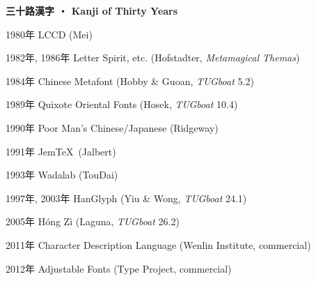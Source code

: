 \documentclass[17pt]{extarticle}
\newenvironment{slide}{\clearpage\vspace*{\fill}\large}{\vspace*{\fill}}
\newenvironment{bil}%
  {\renewcommand{\arraystretch}{0.6}\begin{tabular}{cc}}{\end{tabular}}
\newcommand{\slidetitle}[1]%
   {{\centering\Large\sffamily\bfseries#1\par}\rmfamily}
\begin{document}

\begin{slide}

\slidetitle{三十路漢字 ・ Kanji of Thirty Years}

1980年 LCCD (Mei)

1982年, 1986年 Letter Spirit, etc. (Hofstadter, \textit{Metamagical Themas})

1984年 Chinese Metafont (Hobby \& Guoan, \textit{TUGboat} 5.2)

1989年 Quixote Oriental Fonts (Hosek, \textit{TUGboat} 10.4)

1990年 Poor Man's Chinese/Japanese (Ridgeway)

1991年 Jem\TeX\ (Jalbert)

1993年 Wadalab (TouDai)

1997年, 2003年 HanGlyph (Yiu \& Wong, \textit{TUGboat} 24.1)

2005年 Hóng Zì (Laguna, \textit{TUGboat} 26.2)

2011年 Character Description Language (Wenlin Institute, commercial)

2012年 Adjustable Fonts (Type Project, commercial)
\end{slide}


\begin{slide}
\thispagestyle{empty}
%
\end{slide}

\end{document}
